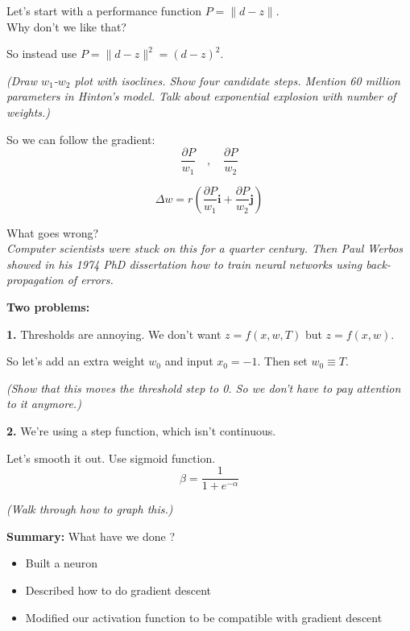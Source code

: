 
\medskip

\medskip

Let's start with a performance function $P=\| d-z \|$.  \\
Why don't we like that?

So instead use $P=\| d-z \|^2 = (d-z)^2$.

\textit{(Draw $w_1$-$w_2$ plot with isoclines.  Show four candidate
  steps.  Mention 60 million parameters in Hinton's model.  Talk about
  exponential explosion with number of weights.)}

So we can follow the gradient:
\begin{displaymath}
  \frac{\partial P}{w_1} \quad , \quad   \frac{\partial P}{w_2}
\end{displaymath}

\begin{displaymath}
  \Delta w = r\left( \frac{\partial P}{w_1} \mathbf{i} +
    \frac{\partial P}{w_2} \mathbf{j} \right)
\end{displaymath}

What goes wrong?\\

\textit{Computer scientists were stuck on this for a quarter century.
Then Paul Werbos showed in his 1974 PhD dissertation how to train
neural networks using back-propagation of errors.}

\textbf{Two problems:}

\textbf{\large 1. } Thresholds are annoying.  We don't want $z = f(x, w, T)$
but $z=f(x, w)$.

So let's add an extra weight $w_0$ and input $x_0=-1$.  Then set $w_0\equiv T$.

\textit{(Show that this moves the threshold step to 0.  So we don't
  have to pay attention to it anymore.)}

\textbf{\large 2. } We're using a step function, which isn't continuous.

Let's smooth it out.  Use sigmoid function.
\begin{displaymath}
  \beta = \frac{1}{1+e^{-\alpha}}
\end{displaymath}

\textit{(Walk through how to graph this.)}

\textbf{Summary: } What have we done ?
\begin{itemize}
\item Built a neuron
\item Described how to do gradient descent
\item Modified our activation function to be compatible with gradient descent
\end{itemize}

